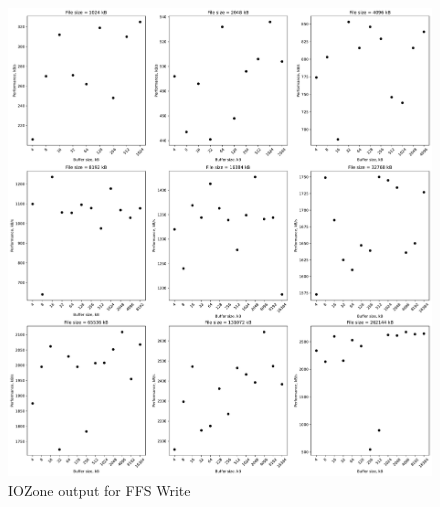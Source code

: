 \begin{figure}[!htb]
	\label{fig:bench_ffs_write}
	\begin{center}
		\includegraphics[width=1.0\textwidth]{figures/benchmarking/ffs/Write.pdf}
	\end{center}
	\caption{IOZone output for FFS Write}
\end{figure}

